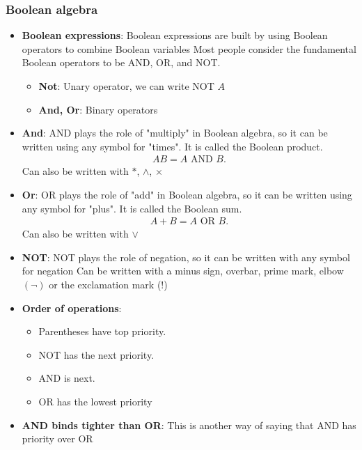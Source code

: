 \documentclass{report}
\begin{document}
    \subsubsection{Boolean algebra}
    \begin{itemize}
        \item \textbf{Boolean expressions}: Boolean expressions are built by using Boolean operators to combine Boolean variables
            \bigbreak \noindent 
            Most people consider the fundamental Boolean operators to be AND, OR, and NOT.
            \begin{itemize}
                \item \textbf{Not}: Unary operator, we can write NOT $A$
                \item \textbf{And, Or}: Binary operators
            \end{itemize}
        \item \textbf{And}: AND plays the role of "multiply" in Boolean algebra, so it can be written using any symbol for "times". It is called the Boolean product.
            \begin{align*}
                AB = A \text{ AND } B
            .\end{align*}
            Can also be written with $*$, $\land$, $\times$
        \item \textbf{Or}: OR plays the role of "add" in Boolean algebra, so it can be written using any symbol for "plus". It is called the Boolean sum.
            \begin{align*}
                A + B = A \text{ OR } B
            .\end{align*}
            Can also be written with $\lor$
        \item \textbf{NOT}: NOT plays the role of negation, so it can be written with any symbol for negation
            \bigbreak \noindent 
            Can be written with a minus sign, overbar, prime mark, elbow $(\neg)$ or the exclamation mark (!)
        \item \textbf{Order of operations}:
            \begin{itemize}
                \item Parentheses have top priority.
                \item NOT has the next priority.
                \item AND is next.
                \item OR has the lowest priority
            \end{itemize}
        \item \textbf{AND binds tighter than OR}: This is another way of saying that AND has priority over OR

\end{itemize}
\end{document}
